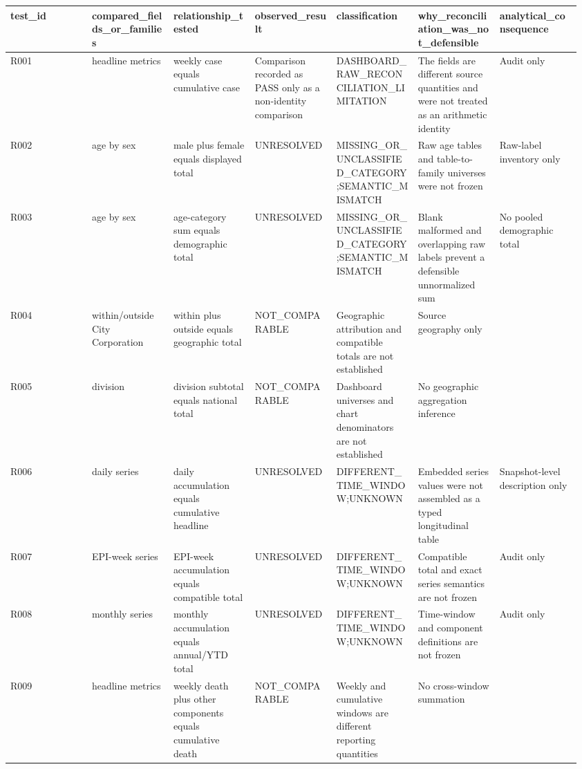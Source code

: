 \begingroup\footnotesize\setlength{\tabcolsep}{3pt}\renewcommand{\arraystretch}{1.15}
\begin{longtable}{P{0.1371\linewidth}P{0.1371\linewidth}P{0.1371\linewidth}P{0.1371\linewidth}P{0.1371\linewidth}P{0.1371\linewidth}P{0.1371\linewidth}}
\toprule
test\_id & compared\_fields\_or\_families & relationship\_tested & observed\_result & classification & why\_reconciliation\_was\_not\_defensible & analytical\_consequence \\
\midrule\endhead
R001 & headline metrics & weekly case equals cumulative case & Comparison recorded as PASS only as a non-identity comparison & DASHBOARD\_RAW\_RECONCILIATION\_LIMITATION & The fields are different source quantities and were not treated as an arithmetic identity & Audit only \\
R002 & age by sex & male plus female equals displayed total & UNRESOLVED & MISSING\_OR\_UNCLASSIFIED\_CATEGORY;SEMANTIC\_MISMATCH & Raw age tables and table-to-family universes were not frozen & Raw-label inventory only \\
R003 & age by sex & age-category sum equals demographic total & UNRESOLVED & MISSING\_OR\_UNCLASSIFIED\_CATEGORY;SEMANTIC\_MISMATCH & Blank malformed and overlapping raw labels prevent a defensible unnormalized sum & No pooled demographic total \\
R004 & within/outside City Corporation & within plus outside equals geographic total & NOT\_COMPARABLE & Geographic attribution and compatible totals are not established & Source geography only &  \\
R005 & division & division subtotal equals national total & NOT\_COMPARABLE & Dashboard universes and chart denominators are not established & No geographic aggregation inference &  \\
R006 & daily series & daily accumulation equals cumulative headline & UNRESOLVED & DIFFERENT\_TIME\_WINDOW;UNKNOWN & Embedded series values were not assembled as a typed longitudinal table & Snapshot-level description only \\
R007 & EPI-week series & EPI-week accumulation equals compatible total & UNRESOLVED & DIFFERENT\_TIME\_WINDOW;UNKNOWN & Compatible total and exact series semantics are not frozen & Audit only \\
R008 & monthly series & monthly accumulation equals annual/YTD total & UNRESOLVED & DIFFERENT\_TIME\_WINDOW;UNKNOWN & Time-window and component definitions are not frozen & Audit only \\
R009 & headline metrics & weekly death plus other components equals cumulative death & NOT\_COMPARABLE & Weekly and cumulative windows are different reporting quantities & No cross-window summation &  \\
\bottomrule
\end{longtable}
\endgroup
